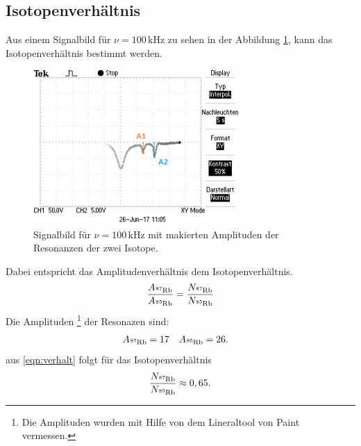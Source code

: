 \subsection{Isotopenverhältnis}
Aus einem Signalbild für $\nu=100\,\si{\kilo\hertz}$
zu sehen in der Abbildung \ref{fig:signal},
kann das Isotopenverhältnis bestimmt werden.

\begin{figure}
  \centering
  \includegraphics[width=0.7\textwidth]{TEK0002.png}
  \caption{Signalbild für $\nu=100\,\si{\kilo\hertz}$ mit makierten Amplituden der Resonanzen der zwei Isotope.}
  \label{fig:signal}
\end{figure}
Dabei entspricht das Amplitudenverhältnis dem Isotopenverhältnis.
\begin{align}
  \frac{A_{\ce{^{87}Rb}} }{A_{\ce{^{85}Rb}} }=\frac{N_{\ce{^{87}Rb}} }{N_{\ce{^{85}Rb}} }  \label{eqn:verhalt}
\end{align}
Die Amplituden \footnote{Die Amplituden wurden mit Hilfe von dem Lineraltool von Paint vermessen.}
der Resonazen sind:
\begin{align*}
  A_{\ce{^{87}Rb}}&=17&   & A_{\ce{^{85}Rb}}=26 .
\end{align*}
aus \eqref{eqn:verhalt} folgt für das Isotopenverhältnis
\begin{align*}
  \frac{N_{\ce{^{87}Rb}}}{N_{\ce{^{85}Rb}}}\approx 0,65 .
\end{align*}



